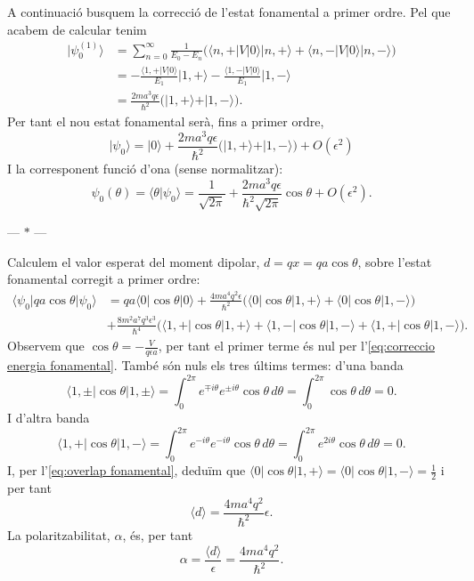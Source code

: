 \documentclass[12pt]{article}
\numberwithin{table}{section}
\numberwithin{figure}{section}
\newcommand{\ket}[1]{\vert {#1} \rangle}
\newcommand{\bra}[1]{\langle #1 \vert}
\newcommand{\braket}[2]{\langle {#1} \vert {#2} \rangle}
\newcommand{\parbreak}{
	\begin{center}
		--- $\ast$ ---
	\end{center} 
}
\begin{document}
A continuació busquem la correcció de l'estat fonamental a primer ordre. Pel que acabem de calcular tenim
\begin{align*}
	\ket{\psi_0^{(1)}} &= \sum_{n = 0}^{\infty} \frac{1}{E_0 - E_n} \big( \bra{n, +}V\ket{0} \ket{n,+} + \bra{n,-}V\ket{0}\ket{n,-} \big) \\
										 &= -\frac{\bra{1,+}V\ket{0}}{E_1} \ket{1,+} -\frac{\bra{1,-}V\ket{0}}{E_1} \ket{1,-} \\
										 &= \frac{2ma^3q\epsilon}{\hbar^2}\big(\ket{1,+} + \ket{1,-}\big).
\end{align*}
Per tant el nou estat fonamental serà, fins a primer ordre,
\begin{equation*}
	\ket{\psi_0} = \ket{0} +\frac{2ma^3q\epsilon}{\hbar^2}\big(\ket{1,+} + \ket{1,-}\big) + O(\epsilon^2)
\end{equation*}
I la corresponent funció d'ona (sense normalitzar):
\begin{equation*}
	\psi_0(\theta) = \braket{\theta}{\psi_0} = \frac{1}{\sqrt{2\pi}} + \frac{2ma^3q\epsilon}{\hbar^2\sqrt{2\pi}} \cos{\theta} + O(\epsilon^2).
\end{equation*}

\parbreak

Calculem el valor esperat del moment dipolar, \( d = qx = qa\cos{\theta} \), sobre l'estat fonamental corregit a primer ordre:
\begin{align*}
	\bra{\psi_0}qa\cos{\theta}\ket{\psi_0} & = qa\bra{0}\cos{\theta}\ket{0} + \frac{4ma^4q^2\epsilon}{\hbar^2} \big( \bra{0}\cos{\theta}\ket{1,+} + \bra{0}\cos{\theta}\ket{1,-} \big) \\
																				 & + \frac{8m^2a^7q^3\epsilon^3}{\hbar^4} \big( \bra{1,+}\cos{\theta}\ket{1,+} + \bra{1,-}\cos{\theta}\ket{1,-} + \bra{1,+}\cos{\theta}\ket{1,-} \big).
\end{align*}
Observem que \( \cos{\theta} = -\frac{V}{q\epsilon a} \), per tant el primer terme és nul per l'\cref{eq:correccio energia fonamental}. També són nuls els tres últims termes: d'una banda
\begin{equation*}
	\bra{1,\pm}\cos{\theta}\ket{1,\pm} = \int_0^{2\pi} e^{\mp i\theta} e^{\pm i\theta} \cos{\theta} \,d\theta = \int_0^{2\pi} \cos{\theta} \, d\theta = 0.
\end{equation*}
I d'altra banda
\begin{equation*}
	\bra{1,+}\cos{\theta}\ket{1,-} = \int_0^{2\pi} e^{- i\theta} e^{- i\theta} \cos{\theta} \,d\theta = \int_0^{2\pi} e^{2i\theta}\cos{\theta} \, d\theta = 0.
\end{equation*}
I, per l'\cref{eq:overlap fonamental}, deduïm que \( \bra{0}\cos{\theta}\ket{1,+} = \bra{0}\cos{\theta}\ket{1,-} = \frac{1}{2} \) i per tant 
\begin{equation*}
	\langle d \rangle = \frac{4ma^4q^2}{\hbar^2}\epsilon.
\end{equation*}
La polaritzabilitat, \( \alpha \), és, per tant
\begin{equation*}
	\alpha = \frac{\langle d \rangle}{\epsilon} = \frac{4ma^4q^2}{\hbar^2}.
\end{equation*}
\end{document}
